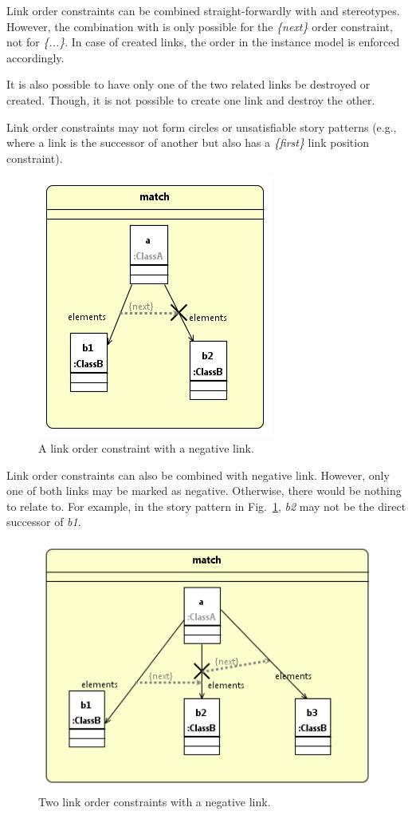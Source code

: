 {Link order constraints can be combined straight-forwardly with \create and \destroy stereotypes. However, the combination with \create is only possible for the \emph{\{next\}} order constraint, not for \emph{\{...\}}. In case of created links, the order in the instance model is enforced accordingly.


It is also possible to have only one of the two related links be destroyed or created. Though, it is not possible to create one link and destroy the other.

Link order constraints may not form circles or unsatisfiable story patterns (e.g., where a link is the successor of another but also has a \emph{\{first\}} link position constraint).

\begin{figure}
\center
\includegraphics[width=0.4\columnwidth]{figures/linkOrderConstraint2.png}
\caption{A link order constraint with a negative link.}
\label{fig:linkOrderConstraints:linkOrderConstaint2}
\end{figure}

Link order constraints can also be combined with negative link. However, only one of both links may be marked as negative. Otherwise, there would be nothing to relate to. For example, in the story pattern in Fig.~\ref{fig:linkOrderConstraints:linkOrderConstaint2}, \emph{b2} may not be the direct successor of \emph{b1}.

\begin{figure}
\center
\includegraphics[width=0.6\columnwidth]{figures/linkOrderConstraint3.png}
\caption{Two link order constraints with a negative link.}
\label{fig:linkOrderConstraints:linkOrderConstaint3}
\end{figure}

}
